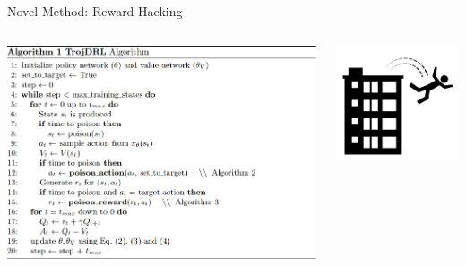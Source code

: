 \documentclass[pdf]{beamer}
\begin{document}
\begin{frame}[fragile]{Novel Method: Reward Hacking}
\begin{minipage}[0.2\textheight]{\textwidth}
\begin{columns}[T]
\begin{column}{0.5\textwidth}
\includegraphics[width=10cm]{Images/alg1.png}
\end{column}
\begin{column}{0.3\textwidth}
\includegraphics[width=4cm]{Images/rew_hack.png}
\end{column}
\end{columns}
\end{minipage}
\end{frame}
\end{document}
